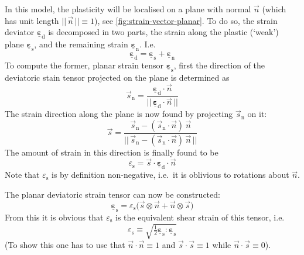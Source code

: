 \documentclass[fleqn]{goose-article}
\newcommand\T[1]{\underline{\bm{{#1}}}}
\begin{document}
In this model, the plasticity will be localised on a plane with normal $\vec{n}$
(which has unit length $||\, \vec{n} \,|| \equiv 1$), see \cref{fig:strain-vector-planar}.
To do so, the strain deviator $\T{\varepsilon}_\mathrm{d}$ is decomposed in two parts,
the strain along the plastic (`weak') plane $\T{\varepsilon}_\mathrm{s}$,
and the remaining strain $\T{\varepsilon}_\mathrm{n}$.
I.e.
\begin{equation}
    \label{eq:planar:strain:decomposition}
    \T{\varepsilon}_\mathrm{d} = \T{\varepsilon}_\mathrm{s} + \T{\varepsilon}_\mathrm{n}
\end{equation}
To compute the former, planar strain tensor $\T{\varepsilon}_\mathrm{s}$,
first the direction of the deviatoric stain tensor projected on the plane is determined as
\begin{equation}
    \vec{s}_\mathrm{n} =
    \frac{
        \T{\varepsilon}_\mathrm{d} \cdot \vec{n}
    }
    {
        ||\, \T{\varepsilon}_\mathrm{d} \cdot \vec{n} \,||
    }
\end{equation}
The strain direction along the plane is now found by projecting $\vec{s}_\mathrm{n}$ on it:
\begin{equation}
    \vec{s} =
    \frac{
        \vec{s}_\mathrm{n} - ( \vec{s}_\mathrm{n} \cdot \vec{n} )\, \vec{n}
    }
    {
        ||\, \vec{s}_\mathrm{n} - ( \vec{s}_\mathrm{n} \cdot \vec{n} )\, \vec{n} \,||
    }
\end{equation}
The amount of strain in this direction is finally found to be
\begin{equation}
    \varepsilon_\mathrm{s} = \vec{s} \cdot \T{\varepsilon}_\mathrm{d} \cdot \vec{n}
\end{equation}
Note that $\varepsilon_\mathrm{s}$ is by definition non-negative,
i.e.\ it is oblivious to rotations about $\vec{n}$.

The planar deviatoric strain tensor can now be constructed:
\begin{equation}
    \T{\varepsilon}_\mathrm{s} = \varepsilon_\mathrm{s}
    \big(
        \vec{s} \otimes \vec{n} + \vec{n} \otimes \vec{s}
    \big)
\end{equation}
From this it is obvious that $\varepsilon_\mathrm{s}$ is
the equivalent shear strain of this tensor, i.e.
\begin{equation}
    \varepsilon_\mathrm{s}
    \equiv
    \sqrt{ \tfrac{1}{2} \T{\varepsilon}_\mathrm{s} : \T{\varepsilon}_\mathrm{s} }
\end{equation}
(To show this one has to use that $\vec{n} \cdot \vec{n} \equiv 1$ and
$\vec{s} \cdot \vec{s} \equiv 1$ while $\vec{n} \cdot \vec{s} \equiv 0$).
\end{document}
